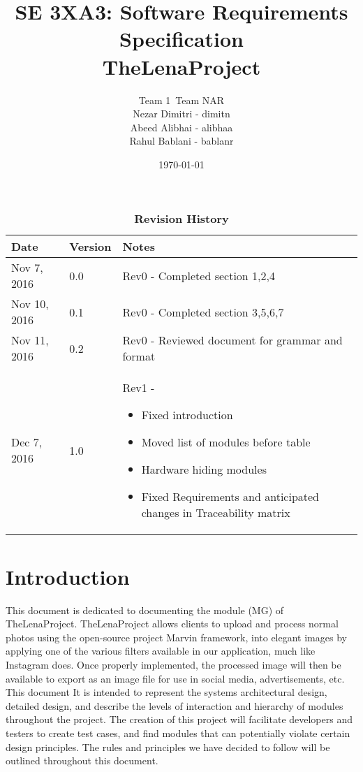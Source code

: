 \documentclass[12pt, titlepage]{article}
\title{SE 3XA3: Software Requirements Specification\\TheLenaProject}
\author{Team 1\, Team NAR
		 \\ Nezar Dimitri - dimitn
		 \\ Abeed Alibhai - alibhaa
		 \\ Rahul Bablani - bablanr
}
\date{\today}
\begin{document}
\maketitle
{}
\tableofcontents
\listoftables
\listoffigures

\begin{table}[htbp]
\caption{\bf Revision History}
\begin{tabularx}{\textwidth}{p{3cm}p{2cm}X}
\toprule {\bf Date} & {\bf Version} & {\bf Notes}\\
\midrule
Nov 7, 2016 & 0.0 & Rev0 - Completed section 1,2,4 \\
Nov 10, 2016 & 0.1 & Rev0 - Completed section 3,5,6,7 \\
Nov 11, 2016 & 0.2 & Rev0 - Reviewed document for grammar and format\\
Dec 7, 2016 & 1.0 & Rev1 - 
\begin{itemize}
	\item Fixed introduction
	\item Moved list of modules before table
	\item Hardware hiding modules
	\item Fixed Requirements and anticipated changes in Traceability matrix
\end{itemize}

\end{tabularx}
\end{table}

\clearpage




\section{Introduction}

This document is dedicated to documenting the module (MG) of
TheLenaProject. TheLenaProject allows clients to upload and process normal photos using the open-source project Marvin framework, into elegant images by applying one of the various filters available in our application, much like Instagram does. Once properly implemented, the processed image will then be available to export
as an image file for use in social media, advertisements, etc. This document It is intended to represent the systems architectural design, detailed design, and describe the levels of interaction and hierarchy of modules throughout the project. The creation of this project will facilitate developers and testers to create test cases, and find modules that can potentially violate certain design principles. The rules and principles we have decided to follow will be outlined throughout this document.
\end{document}
